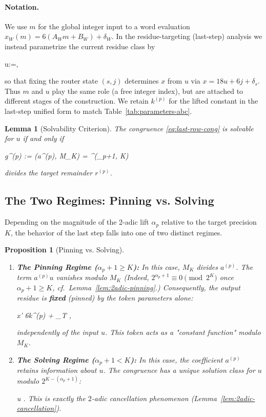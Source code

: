 \documentclass[11pt,letterpaper]{amsart}
\def\[{ }%
\def\]{ }%
\theoremstyle{definition}
\theoremstyle{plain}
\newtheorem{lemma}{Lemma}
\newtheorem{proposition}{Proposition}
\theoremstyle{plain}
\theoremstyle{remark}
\begin{document}
\paragraph{Notation.}
We use $m$ for the global integer input to a word evaluation $x_W(m)=6(A_W m+B_W)+\delta_W$.
In the residue-targeting (last-step) analysis we instead parametrize the current residue class by
\[
u:=\left\lfloor {}\right\rfloor,
\]
so that fixing the router state $(s,j)$ determines $x$ from $u$ via $x=18u+6j+\delta_s$.
Thus $m$ and $u$ play the same role (a free integer index), but are attached to different stages of the construction.
We retain $k^{(p)}$ for the lifted constant in the last-step unified form to match Table~\ref{tab:parameters-abc}.


\begin{lemma}[Solvability Criterion]
\label{lem:last-row-p}
The congruence \eqref{eq:last-row-cong} is solvable for $u$ if and only if
\[
g^{(p)} \;:=\; \gcd(a^{(p)}, M_K) \;= ^{\min(\alpha_p+1, K)}
\]
divides the target remainder $r^{(p)}$.
\end{lemma}

\subsection{The Two Regimes: Pinning vs. Solving}
Depending on the magnitude of the 2-adic lift $\alpha_p$ relative to the target precision $K$, the behavior of the last step falls into one of two distinct regimes.

\begin{proposition}[Pinning vs. Solving]
\label{prop:pin-vs-solve}
\begin{enumerate}
    \item \textbf{The Pinning Regime ($\alpha_p + 1 \ge K$):}
    In this case, $M_K$ divides $a^{(p)}$. The term $a^{(p)}u$ vanishes modulo $M_K$
    (Indeed, $2^{\alpha_p+1}\equiv 0\pmod{2^K}$ once $\alpha_p+1\ge K$, cf.\ Lemma~\ref{lem:2adic-pinning}.)
    Consequently, the output residue is \textbf{fixed} (pinned) by the token parameters alone:
    \[
    x' \;\equiv\; 6k^{(p)} + \delta_T ,
    \]
    independently of the input $u$. This token acts as a "constant function" modulo $M_K$.

    \item \textbf{The Solving Regime ($\alpha_p + 1 < K$):}
    In this case, the coefficient $a^{(p)}$ retains information about $u$. The congruence has a unique solution class for $u$ modulo $2^{K-(\alpha_p+1)}$:
    \[
    u \;\equiv\;  .
    \] This is exactly the $2$-adic cancellation phenomenon (Lemma~\ref{lem:2adic-cancellation}).
\end{enumerate}
\end{proposition}
\end{document}
